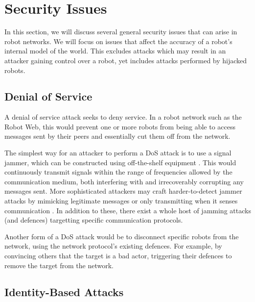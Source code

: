\section{Security Issues}
In this section, we will discuss several general security issues that can arise in robot networks. We will focus on issues that affect the accuracy of a robot's internal model of the world. This excludes attacks which may result in an attacker gaining control over a robot, yet includes attacks performed by hijacked robots.

\subsection{Denial of Service} %
A denial of service attack seeks to deny service. In a robot network such as the Robot Web, this would prevent one or more robots from being able to access messages sent by their peers and essentially cut them off from the network.

The simplest way for an attacker to perform a DoS attack is to use a signal jammer, which can be constructed using off-the-shelf equipment \cite{SignalJamming}. This would continuously transmit signals within the range of frequencies allowed by the communication medium, both interfering with and irrecoverably corrupting any messages sent. More sophisticated attackers may craft harder-to-detect jammer attacks by mimicking legitimate messages or only transmitting when it senses communication \cite{SignalJamming}. In addition to these, there exist a whole host of jamming attacks (and defences) targetting specific communication protocols.

Another form of a DoS attack would be to disconnect specific robots from the network, using the network protocol's existing defences. For example, by convincing others that the target is a bad actor, triggering their defences to remove the target from the network. %

\subsection{Identity-Based Attacks}

